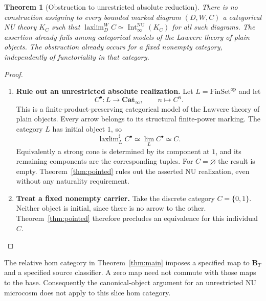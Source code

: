 \documentclass[oneside]{article}
\theoremstyle{plain}
\newtheorem{theorem}{Theorem}[section]
\theoremstyle{definition}
\theoremstyle{remark}
\newcommand{\B}{\mathbf B}
\newcommand{\Cat}{\mathbf{Cat}_{\infty}}
\newcommand{\Int}{\operatorname{Int}}
\newcommand{\NU}{\mathrm{NU}}
\newcommand{\laxlim}{\mathop{\mathrm{laxlim}}}
\newcommand{\op}{\mathrm{op}}
\begin{document}
\begin{theorem}[Obstruction to unrestricted absolute reduction]\label{thm:noabsolute}
There is no construction assigning to every bounded marked diagram $(D,W,C)$ a categorical NU theory $K_C$ such that $\laxlim_D^W C\simeq\Int^{\NU}_\infty(K_C)$ for all such diagrams. The assertion already fails among categorical models of the Lawvere theory of plain objects. The obstruction already occurs for a fixed nonempty category, independently of functoriality in that category.
\end{theorem}
\begin{proof}
\leavevmode
\begin{enumerate}
\item \textbf{Rule out an unrestricted absolute realization.} Let $L=\mathrm{FinSet}^{\op}$ and let
\[
 C^{\bullet}:L\longrightarrow\Cat,\qquad n\longmapsto C^n.
\]
This is a finite-product-preserving categorical model of the Lawvere theory of plain objects. Every arrow belongs to its structural finite-power marking. The category $L$ has initial object $1$, so
\[
 \laxlim\nolimits_L^{\sharp}C^{\bullet}
 \simeq\lim_LC^{\bullet}\simeq C.
\]
Equivalently a strong cone is determined by its component at $1$, and its remaining components are the corresponding tuples. For $C=\varnothing$ the result is empty. Theorem~\ref{thm:pointed} rules out the asserted NU realization, even without any naturality requirement.
\item \textbf{Treat a fixed nonempty carrier.}
Take the discrete category $C=\{0,1\}$. Neither object is initial,
since there is no arrow to the other. Theorem~\ref{thm:pointed}
therefore precludes an equivalence for this individual $C$.\qedhere
\end{enumerate}
\end{proof}


The relative hom category in Theorem~\ref{thm:main} imposes a specified
map to $\B_T$ and a specified source classifier. A zero map need not
commute with those maps to the base. Consequently the canonical-object
argument for an unrestricted NU microcosm does not apply to this slice
hom category. 
\end{document}
